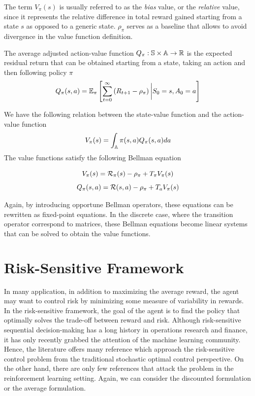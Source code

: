 The term $V_\pi(s)$ is usually referred to as the \emph{bias} value, or the
\emph{relative} value, since it represents the relative difference in total
reward gained starting from a state $s$ as opposed to a generic state. 
$\rho_\pi$ serves as a baseline that allows to avoid divergence in the value
function definition.
\begin{definition}
	The average adjusted action-value function $Q_\pi : \S \times \A \to \R$ is 
	the expected residual return that can be obtained starting from a state,
	taking an action and then following policy $\pi$
	\begin{equation}
		Q_\pi(s, a) = \E[\pi]{\sum^{\infty}_{t=0} \left(R_{t+1} -
			\rho_\pi\right) \bigg| S_0 = s, A_0
		= a}
	\end{equation}
\end{definition}
We have the following relation between the state-value function and the
action-value function
\begin{equation}\label{eq:VQ_equality}
	V_\pi(s) = \int_\A \pi(s,a) Q_\pi(s,a) da
\end{equation}
The value functions satisfy the following Bellman equation 
\begin{proposition}
	\begin{equation}
		V_\pi(s) = \calR_\pi(s) - \rho_\pi + T_\pi V_\pi(s)
	\end{equation}
	\begin{equation}
			Q_\pi(s,a) = \calR(s,a) - \rho_\pi + T_a V_\pi(s)
	\end{equation}
\end{proposition}
Again, by introducing opportune Bellman operators, these equations can be rewritten as fixed-point equations. In the discrete case, where the transition operator correspond to matrices, these Bellman equations become linear systems that can be solved to obtain the value functions. 

\section{Risk-Sensitive Framework}
\label{sec:risk_sensitive_formulation}
In many application, in addition to maximizing the average reward, the agent
may want to control risk by minimizing some measure of variability in rewards. In the risk-sensitive framework, the goal of the agent is to find the policy that optimally solves the trade-off between reward and risk. Although risk-sensitive sequential decision-making has a long history in operations research and finance, it has only recently grabbed the attention of the machine learning community. Hence, the literature offers many reference which approach the risk-sensitive control problem from the traditional stochastic optimal control perspective. On the other hand, there are only few references that attack the problem in the reinforcement learning setting. Again, we can consider the discounted formulation or the average formulation.    

